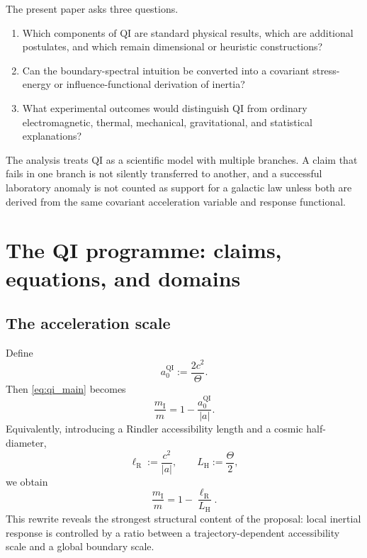 \documentclass[11pt]{article}
\newcommand{\QI}{\mathrm{QI}}
\newcommand{\ellR}{\ell_{\mathrm{R}}}
\newcommand{\LH}{L_{\mathrm{H}}}
\begin{document}
The present paper asks three questions.
\begin{enumerate}[leftmargin=1.55em]
    \item Which components of QI are standard physical results, which are additional postulates, and which remain dimensional or heuristic constructions?
    \item Can the boundary-spectral intuition be converted into a covariant stress-energy or influence-functional derivation of inertia?
    \item What experimental outcomes would distinguish QI from ordinary electromagnetic, thermal, mechanical, gravitational, and statistical explanations?
\end{enumerate}

The analysis treats QI as a scientific model with multiple branches. A claim that fails in one branch is not silently transferred to another, and a successful laboratory anomaly is not counted as support for a galactic law unless both are derived from the same covariant acceleration variable and response functional.

\section{The QI programme: claims, equations, and domains}
\label{sec:qi_programme}

\subsection{The acceleration scale}

Define
\begin{equation}
    a_{0}^{\QI}:=\frac{2c^{2}}{\Theta}.
    \label{eq:a0_qi}
\end{equation}
Then \cref{eq:qi_main} becomes
\begin{equation}
    \frac{m_{\mathrm I}}{m}=1-\frac{a_{0}^{\QI}}{|a|}.
    \label{eq:qi_eta}
\end{equation}
Equivalently, introducing a Rindler accessibility length and a cosmic half-diameter,
\begin{equation}
    \ellR:=\frac{c^{2}}{|a|},
    \qquad
    \LH:=\frac{\Theta}{2},
\end{equation}
we obtain
\begin{equation}
    \frac{m_{\mathrm I}}{m}=1-\frac{\ellR}{\LH}.
    \label{eq:length_ratio}
\end{equation}
This rewrite reveals the strongest structural content of the proposal: local inertial response is controlled by a ratio between a trajectory-dependent accessibility scale and a global boundary scale.
\end{document}
